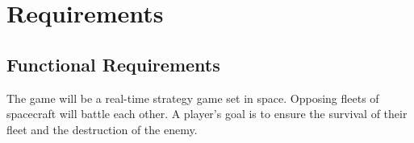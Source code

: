 \section[Requirements]{Requirements}
\label{section:requirements}



\subsection{Functional Requirements}


The game will be a real-time strategy game set in space. Opposing fleets of spacecraft
will battle each other. A player's goal is to ensure the survival of their fleet and the destruction
of the enemy.

